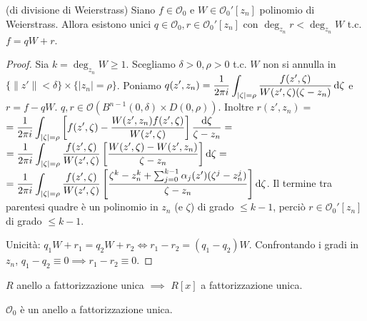 \begin{thm}
  (di divisione di Weierstrass) Siano $f \in \mathcal{O}_0$ e $W \in \mathcal{O}_0'[z_n]$ polinomio di Weierstrass. Allora esistono unici $q \in \mathcal{O}_0, r \in \mathcal{O}_0'[z_n]$ con $\deg_{z_n}{r}<\deg_{z_n}{W}$ t.c. $f=qW+r$.
\end{thm}

\begin{proof}
  Sia $k=\deg_{z_n}{W} \ge 1$. Scegliamo $\delta>0,\rho>0$ t.c. $W$ non si annulla in $\{\|z'\|<\delta\}\times\{|z_n|=\rho\}$. Poniamo $\displaystyle q(z',z_n)=\frac{1}{2\pi i}\int_{|\zeta|=\rho} \frac{f(z',\zeta)}{W(z',\zeta)(\zeta-z_n)}\mathop{}\!\mathrm{d}\zeta$ e $r=f-qW$.
  $q,r \in \mathcal{O}(B^{n-1}(0,\delta)\times D(0,\rho))$.
  Inoltre $r(z',z_n)=$ \\
  $\displaystyle=\frac{1}{2\pi i} \int_{|\zeta|=\rho}\left[f(z',\zeta)-\frac{W(z',z_n)f(z',\zeta)}{W(z',\zeta)}\right]\frac{\mathop{}\!\mathrm{d}\zeta}{\zeta-z_n}=$ \\
  $\displaystyle=\frac{1}{2\pi i}\int_{|\zeta|=\rho} \frac{f(z',\zeta)}{W(z',\zeta)}\left[\frac{W(z',\zeta)-W(z',z_n)}{\zeta-z_n}\right]\mathop{}\!\mathrm{d}\zeta=$ \\
  $\displaystyle=\frac{1}{2\pi i} \int_{|\zeta|=\rho} \frac{f(z',\zeta)}{W(z',\zeta)}\left[\frac{\zeta^k-z_n^k+\sum_{j=0}^{k-1} \alpha_j(z')(\zeta^j-z_n^j)}{\zeta-z_n}\right]\mathop{}\!\mathrm{d}\zeta$.
  Il termine tra parentesi quadre è un polinomio in $z_n$ (e $\zeta$) di grado $\le k-1$, perciò $r \in \mathcal{O}_0'[z_n]$ di grado $\le k-1$.

  Unicità: $q_1W+r_1=q_2W+r_2 \iff r_1-r_2=(q_1-q_2)W$. Confrontando i gradi in $z_n$, $q_1-q_2 \equiv 0 \implies r_1-r_2 \equiv 0$.
\end{proof}

\begin{ftt}
  $R$ anello a fattorizzazione unica $\implies$ $R[x]$ a fattorizzazione unica.
\end{ftt}

\begin{thm}
  $\mathcal{O}_0$ è un anello a fattorizzazione unica.
\end{thm}

